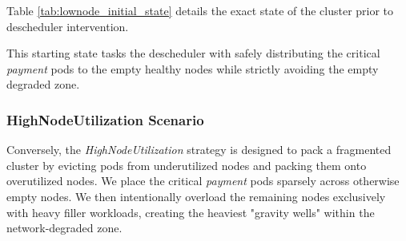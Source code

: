 Table \ref{tab:lownode_initial_state} details the exact state of the cluster prior to descheduler intervention.

\begin{table}[H]
    \centering
    \caption{Resource Allocation: Initial State for LowNodeUtilization Strategy}
    \label{tab:lownode_initial_state}
\end{table}

This starting state tasks the descheduler with safely distributing the critical \textit{payment} pods to the empty healthy nodes while strictly avoiding the empty degraded zone.

\subsubsection{HighNodeUtilization Scenario}
\label{subsubsec:netaware4_workload_highnode}
Conversely, the \textit{HighNodeUtilization} strategy is designed to pack a fragmented cluster by evicting pods from underutilized nodes and packing them onto overutilized nodes. We place the critical \textit{payment} pods sparsely across otherwise empty nodes. We then intentionally overload the remaining nodes exclusively with heavy filler workloads, creating the heaviest "gravity wells" within the network-degraded zone.

